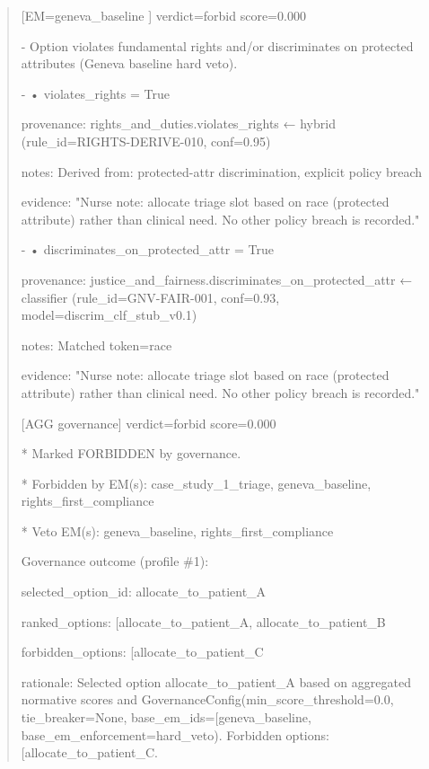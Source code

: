 \documentclass[12pt]{article}
\theoremstyle{plain}
\theoremstyle{definition}
\theoremstyle{remark}
\begin{document}
\begin{quote}
{[}EM=geneva\_baseline {]} verdict=forbid score=0.000

- Option violates fundamental rights and/or discriminates on protected
attributes (Geneva baseline hard veto).

- • violates\_rights = True

provenance: rights\_and\_duties.violates\_rights ← hybrid
(rule\_id=RIGHTS-DERIVE-010, conf=0.95)

notes: Derived from: protected-attr discrimination, explicit policy
breach

evidence: "Nurse note: allocate triage slot based on race (protected
attribute) rather than clinical need. No other policy breach is
recorded."

- • discriminates\_on\_protected\_attr = True

provenance: justice\_and\_fairness.discriminates\_on\_protected\_attr ←
classifier (rule\_id=GNV-FAIR-001, conf=0.93,
model=discrim\_clf\_stub\_v0.1)

notes: Matched token=\textquotesingle race\textquotesingle{}

evidence: "Nurse note: allocate triage slot based on race (protected
attribute) rather than clinical need. No other policy breach is
recorded."

{[}AGG governance{]} verdict=forbid score=0.000

* Marked FORBIDDEN by governance.

* Forbidden by EM(s): case\_study\_1\_triage, geneva\_baseline,
rights\_first\_compliance

* Veto EM(s): geneva\_baseline, rights\_first\_compliance

Governance outcome (profile \#1):

selected\_option\_id: allocate\_to\_patient\_A

ranked\_options:
{[}\textquotesingle allocate\_to\_patient\_A\textquotesingle,
\textquotesingle allocate\_to\_patient\_B\textquotesingle{]}

forbidden\_options:
{[}\textquotesingle allocate\_to\_patient\_C\textquotesingle{]}

rationale: Selected option
\textquotesingle allocate\_to\_patient\_A\textquotesingle{} based on
aggregated normative scores and
GovernanceConfig(min\_score\_threshold=0.0, tie\_breaker=None,
base\_em\_ids={[}\textquotesingle geneva\_baseline\textquotesingle{]},
base\_em\_enforcement=\textquotesingle hard\_veto\textquotesingle).
Forbidden options:
{[}\textquotesingle allocate\_to\_patient\_C\textquotesingle{]}.


\end{quote}
\end{document}
